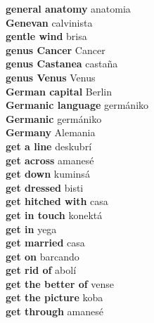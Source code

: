\textbf{ general anatomy  } anatomia \\
\textbf{ Genevan  } calvinista \\
\textbf{ gentle wind  } brisa \\
\textbf{ genus Cancer  } Cancer \\
\textbf{ genus Castanea  } castaña \\
\textbf{ genus Venus  } Venus \\
\textbf{ German capital  } Berlin \\
\textbf{ Germanic language  } germániko \\
\textbf{ Germanic  } germániko \\
\textbf{ Germany  } Alemania \\
\textbf{ get a line  } deskubrí \\
\textbf{ get across  } amanesé \\
\textbf{ get down  } kuminsá \\
\textbf{ get dressed  } bisti \\
\textbf{ get hitched with  } casa \\
\textbf{ get in touch  } konektá \\
\textbf{ get in  } yega \\
\textbf{ get married  } casa \\
\textbf{ get on  } barcando \\
\textbf{ get rid of  } abolí \\
\textbf{ get the better of  } vense \\
\textbf{ get the picture  } koba \\
\textbf{ get through  } amanesé \\
